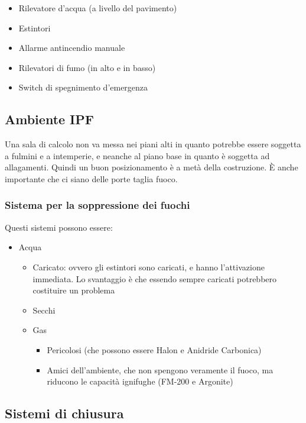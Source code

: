 \begin{itemize}
\item Rilevatore d'acqua (a livello del pavimento)
\item Estintori
\item Allarme antincendio manuale
\item Rilevatori di fumo (in alto e in basso)
\item Switch di spegnimento d'emergenza
\end{itemize}

\subsection{Ambiente IPF}

Una sala di calcolo non va messa nei piani alti in quanto potrebbe essere 
soggetta a fulmini e a intemperie, e neanche al piano base in quanto è soggetta 
ad allagamenti. Quindi un buon posizionamento è a metà della costruzione. È 
anche importante che ci siano delle porte taglia fuoco.

\subsubsection{Sistema per la soppressione dei fuochi}

Questi sistemi possono essere:
\begin{itemize}
\item Acqua
\begin{itemize}
\item Caricato: ovvero gli estintori sono caricati, e hanno l'attivazione 
immediata. Lo svantaggio è che essendo sempre caricati potrebbero costituire un 
problema
\item Secchi
\end{itemize}
\begin{itemize}
\item Gas
\begin{itemize}
\item Pericolosi (che possono essere Halon e Anidride Carbonica)
\item Amici dell'ambiente, che non spengono veramente il fuoco, ma riducono le 
capacità ignifughe (FM-200 e Argonite)
\end{itemize}
\end{itemize}
\end{itemize}

\subsection{Sistemi di chiusura}


